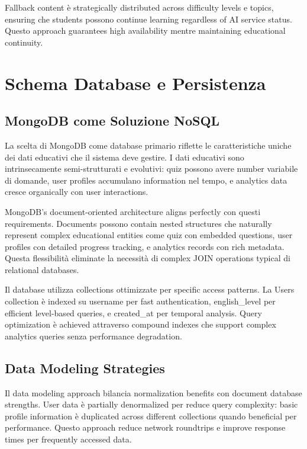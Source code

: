 \documentclass[12pt,a4paper]{article}
\begin{document}
Fallback content è strategically distributed across difficulty levels e topics, ensuring che students possono continue learning regardless of AI service status. Questo approach guarantees high availability mentre maintaining educational continuity.

\section{Schema Database e Persistenza}

\subsection{MongoDB come Soluzione NoSQL}

La scelta di MongoDB come database primario riflette le caratteristiche uniche dei dati educativi che il sistema deve gestire. I dati educativi sono intrinsecamente semi-strutturati e evolutivi: quiz possono avere number variabile di domande, user profiles accumulano information nel tempo, e analytics data cresce organically con user interactions.

MongoDB's document-oriented architecture aligns perfectly con questi requirements. Documents possono contain nested structures che naturally represent complex educational entities come quiz con embedded questions, user profiles con detailed progress tracking, e analytics records con rich metadata. Questa flessibilità eliminate la necessità di complex JOIN operations typical di relational databases.

Il database utilizza collections ottimizzate per specific access patterns. La Users collection è indexed su username per fast authentication, english\_level per efficient level-based queries, e created\_at per temporal analysis. Query optimization è achieved attraverso compound indexes che support complex analytics queries senza performance degradation.

\subsection{Data Modeling Strategies}

Il data modeling approach bilancia normalization benefits con document database strengths. User data è partially denormalized per reduce query complexity: basic profile information è duplicated across different collections quando beneficial per performance. Questo approach reduce network roundtrips e improve response times per frequently accessed data.
\end{document}
